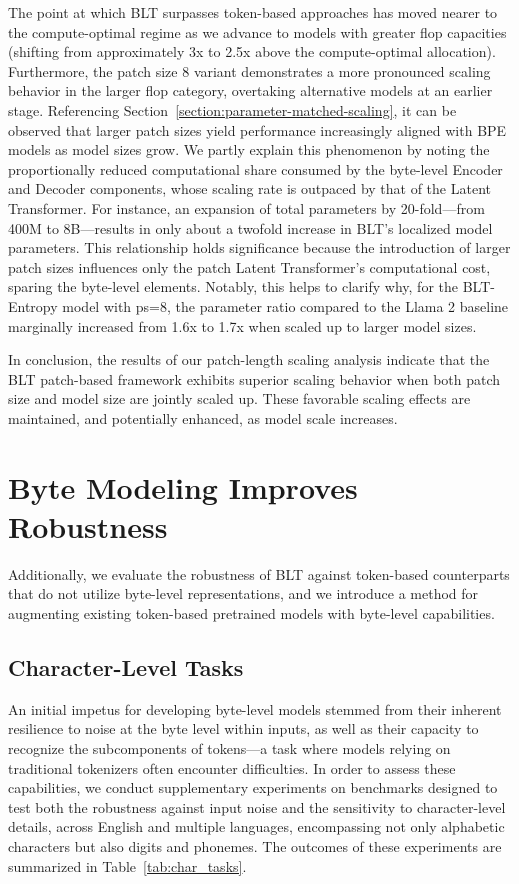 The point at which {\textsc BLT} surpasses token-based approaches has moved nearer to the compute-optimal regime as we advance to models with greater flop capacities (shifting from approximately 3x to 2.5x above the compute-optimal allocation). Furthermore, the patch size 8 variant demonstrates a more pronounced scaling behavior in the larger flop category, overtaking alternative models at an earlier stage. Referencing Section~\ref{section:parameter-matched-scaling}, it can be observed that larger patch sizes yield performance increasingly aligned with BPE models as model sizes grow. We partly explain this phenomenon by noting the proportionally reduced computational share consumed by the byte-level Encoder and Decoder components, whose scaling rate is outpaced by that of the Latent Transformer. For instance, an expansion of total parameters by 20-fold—from 400M to 8B—results in only about a twofold increase in {\textsc BLT}'s localized model parameters. This relationship holds significance because the introduction of larger patch sizes influences only the patch Latent Transformer’s computational cost, sparing the byte-level elements. Notably, this helps to clarify why, for the {\textsc BLT}-Entropy model with ps=8, the parameter ratio compared to the Llama 2 baseline marginally increased from 1.6x to 1.7x when scaled up to larger model sizes.

In conclusion, the results of our patch-length scaling analysis indicate that the {\textsc BLT} patch-based framework exhibits superior scaling behavior when both patch size and model size are jointly scaled up. These favorable scaling effects are maintained, and potentially enhanced, as model scale increases.

\section{Byte Modeling Improves Robustness} Additionally, we evaluate the robustness of {\textsc BLT} against token-based counterparts that do not utilize byte-level representations, and we introduce a method for augmenting existing token-based pretrained models with byte-level capabilities.
\label{sec:robustness}

\subsection{Character-Level Tasks}

An initial impetus for developing byte-level models stemmed from their inherent resilience to noise at the byte level within inputs, as well as their capacity to recognize the subcomponents of tokens—a task where models relying on traditional tokenizers often encounter difficulties. In order to assess these capabilities, we conduct supplementary experiments on benchmarks designed to test both the robustness against input noise and the sensitivity to character-level details, across English and multiple languages, encompassing not only alphabetic characters but also digits and phonemes. The outcomes of these experiments are summarized in Table~\ref{tab:char_tasks}.

